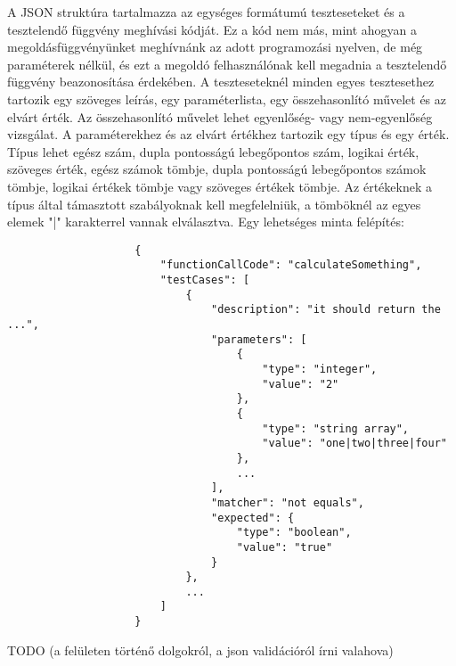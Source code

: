 \documentclass{elteikthesis}
\begin{document}
				A JSON struktúra tartalmazza az egységes formátumú teszteseteket és a tesztelendő függvény meghívási kódját. Ez a kód nem más, mint ahogyan a megoldásfüggvényünket meghívnánk az adott programozási nyelven, de még paraméterek nélkül, és ezt a megoldó felhasználónak kell megadnia a tesztelendő függvény beazonosítása érdekében. A teszteseteknél minden egyes tesztesethez tartozik egy szöveges leírás, egy paraméterlista, egy összehasonlító művelet és az elvárt érték. Az összehasonlító művelet lehet egyenlőség- vagy nem-egyenlőség vizsgálat. A paraméterekhez és az elvárt értékhez tartozik egy típus és egy érték. Típus lehet egész szám, dupla pontosságú lebegőpontos szám, logikai érték, szöveges érték, egész számok tömbje, dupla pontosságú lebegőpontos számok tömbje, logikai értékek tömbje vagy szöveges értékek tömbje. Az értékeknek a típus által támasztott szabályoknak kell megfelelniük, a tömböknél az egyes elemek "|" karakterrel vannak elválasztva. Egy lehetséges minta felépítés:
				\begin{verbatim}
					{
						"functionCallCode": "calculateSomething",
						"testCases": [
							{
								"description": "it should return the ...",
								"parameters": [
									{
										"type": "integer",
										"value": "2"
									},
									{
										"type": "string array",
										"value": "one|two|three|four"
									},
									...
								],
								"matcher": "not equals",
								"expected": {
									"type": "boolean",
									"value": "true"
								}
							},
							...
						]
					}
				\end{verbatim}
				TODO (a felületen történő dolgokról, a json validációról írni valahova)
\end{document}
